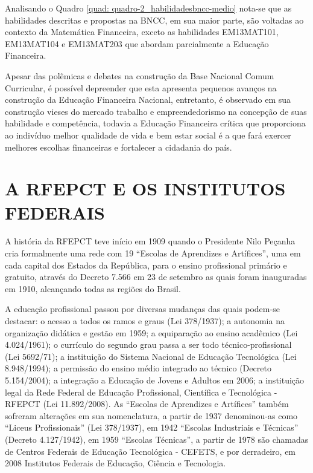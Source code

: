 Analisando o Quadro \ref{quad: quadro-2_habilidadesbncc-medio} nota-se que as habilidades descritas e propostas na BNCC, em sua maior parte, são voltadas ao contexto da Matemática Financeira, exceto as habilidades EM13MAT101, EM13MAT104 e EM13MAT203 que abordam parcialmente a Educação Financeira.

Apesar das polêmicas e debates na construção da Base Nacional Comum Curricular, é possível depreender que esta apresenta pequenos avanços na construção da Educação Financeira Nacional, entretanto, é observado em sua construção vieses do mercado trabalho e empreendedorismo na concepção de suas habilidade e competência, todavia a Educação Financeira crítica que proporciona ao indivíduo melhor qualidade de vida e bem estar social é a que fará exercer melhores escolhas financeiras e fortalecer a cidadania do país.

\section{A RFEPCT E OS INSTITUTOS FEDERAIS}
A história da RFEPCT teve início em 1909 quando o Presidente Nilo Peçanha cria formalmente uma rede com 19 “Escolas de Aprendizes e Artífices”, uma em cada capital dos Estados da República, para o ensino profissional primário e gratuito, através do Decreto 7.566 em 23 de setembro \cite{brasil1909} as quais foram inauguradas em 1910, alcançando todas as regiões do Brasil.

A educação profissional passou por diversas mudanças das quais podem-se destacar: o acesso a todos os ramos e graus (Lei 378/1937); a autonomia na organização didática e gestão em 1959; a equiparação ao ensino acadêmico (Lei 4.024/1961); o currículo do segundo grau passa a ser todo técnico-profissional (Lei 5692/71); a instituição do Sistema Nacional de Educação Tecnológica (Lei 8.948/1994); a permissão do ensino médio integrado ao técnico (Decreto 5.154/2004);  a integração a Educação de Jovens e Adultos em 2006; a instituição legal da Rede Federal de Educação Profissional, Científica e Tecnológica - RFEPCT (Lei 11.892/2008). As “Escolas de Aprendizes e Artífices” também sofreram alterações em sua nomenclatura, a partir de 1937 denominou-as como “Liceus Profissionais” (Lei 378/1937), em 1942 “Escolas Industriais e Técnicas” (Decreto 4.127/1942), em 1959 “Escolas Técnicas”, a partir de 1978 são chamadas de Centros Federais de Educação Tecnológica - CEFETS, e por derradeiro, em 2008 Institutos Federais de Educação, Ciência e Tecnologia.

